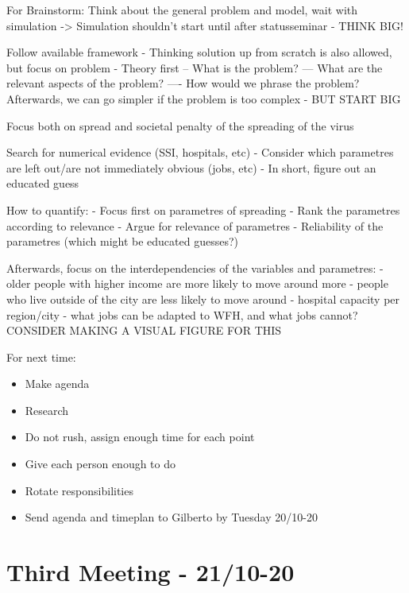 For Brainstorm:
Think about the general problem and model, wait with simulation -> Simulation shouldn't start until after statusseminar
- THINK BIG!

Follow available framework
- Thinking solution up from scratch is also allowed, but focus on problem
- Theory first 
-- What is the problem?
--- What are the relevant aspects of the problem?
---- How would we phrase the problem?
Afterwards, we can go simpler if the problem is too complex - BUT START BIG

Focus both on spread and societal penalty of the spreading of the virus

Search for numerical evidence (SSI, hospitals, etc)
- Consider which parametres are left out/are not immediately obvious (jobs, etc)
- In short, figure out an educated guess

How to quantify:
- Focus first on parametres of spreading
- Rank the parametres according to relevance
- Argue for relevance of parametres
- Reliability of the parametres (which might be educated guesses?)

Afterwards, focus on the interdependencies of the variables and parametres:
- older people with higher income are more likely to move around more
- people who live outside of the city are less likely to move around
- hospital capacity per region/city 
- what jobs can be adapted to WFH, and what jobs cannot?
CONSIDER MAKING A VISUAL FIGURE FOR THIS

For next time: 
\begin{itemize}
\item Make agenda
\item Research
\item Do not rush, assign enough time for each point
\item Give each person enough to do
\item Rotate responsibilities
\item Send agenda and timeplan to Gilberto by Tuesday 20/10-20
\end{itemize}
\newpage



\section{Third Meeting - 21/10-20}
